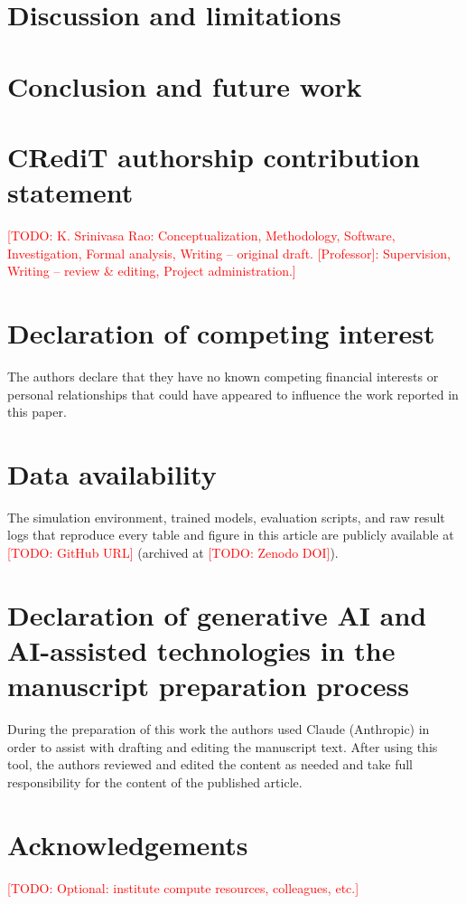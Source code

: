 \documentclass[preprint,12pt]{elsarticle}
\newcommand{\todo}[1]{\textcolor{red}{[TODO: #1]}}
\begin{document}
\section{Discussion and limitations}\label{sec:discussion}


\section{Conclusion and future work}\label{sec:conclusion}


\section*{CRediT authorship contribution statement}
\todo{K. Srinivasa Rao: Conceptualization, Methodology, Software,
Investigation, Formal analysis, Writing -- original draft.
[Professor]: Supervision, Writing -- review \& editing, Project
administration.}

\section*{Declaration of competing interest}
The authors declare that they have no known competing financial interests or
personal relationships that could have appeared to influence the work
reported in this paper.

\section*{Data availability}
The simulation environment, trained models, evaluation scripts, and raw
result logs that reproduce every table and figure in this article are
publicly available at \todo{GitHub URL} (archived at \todo{Zenodo DOI}).

\section*{Declaration of generative AI and AI-assisted technologies in the
manuscript preparation process}
During the preparation of this work the authors used Claude (Anthropic) in
order to assist with drafting and editing the manuscript text. After using
this tool, the authors reviewed and edited the content as needed and take
full responsibility for the content of the published article.

\section*{Acknowledgements}
\todo{Optional: institute compute resources, colleagues, etc.}



\end{document}
